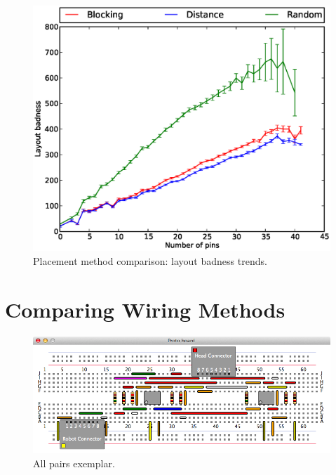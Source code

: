 \begin{figure}
\begin{center}
\includegraphics[width=\textwidth]{Images/placement_badness_trend_comparison.eps}
\caption{Placement method comparison: layout badness trends.}
\label{fig:placement_badness_trend}
\end{center}
\end{figure}

\section{Comparing Wiring Methods}

\begin{figure}[H]
\begin{center}
\includegraphics[width=\textwidth]{Images/exemplar_all_pairs.png}
\caption{All pairs exemplar.}
\end{center}
\end{figure}

